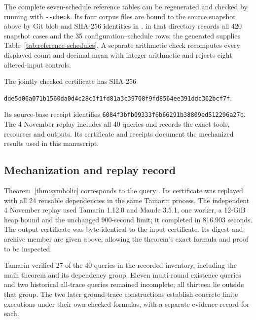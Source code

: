 The complete seven-schedule reference tables can be regenerated and checked
by running
 with
\texttt{-{}-check}. Its four corpus files are bound to the source
snapshot above by Git blob and SHA-256 identities in
.
 in that directory records all 420 snapshot cases and
the 35 configuration--schedule rows; the generated
 supplies Table~\ref{tab:reference-schedules}.
A separate arithmetic check recomputes every displayed count and decimal mean
with integer arithmetic and rejects eight altered-input controls.

The jointly checked certificate has SHA-256
\begin{center}
\small\texttt{dde5d06a071b1560da0d4c28c3f1fd81a3c39708f9fd8564ee391ddc362bcf7f}.
\end{center}
Its source-base receipt identifies
\texttt{6084f3bfb09333f6b66291b38809ed512296a27b}.
The 4 November replay includes all 40 queries and records the exact tools,
resources and outputs. Its certificate and receipts document the
mechanized results used in this manuscript.



\subsection{Mechanization and replay record}

Theorem~\ref{thm:symbolic} corresponds to the query
.
Its certificate was replayed with all 24 reusable dependencies in the same
Tamarin process. The independent 4 November replay used Tamarin 1.12.0 and
Maude 3.5.1, one worker, a 12-GiB heap bound and the unchanged 900-second limit;
it completed in 816.903 seconds. The output certificate was byte-identical to
the input certificate. Its digest and archive member are given above,
allowing the theorem's exact formula and proof to be inspected.

Tamarin verified 27 of the 40 queries in the recorded inventory,
including the main theorem and its dependency group. Eleven multi-round
existence queries and two historical all-trace queries remained
incomplete; all thirteen lie outside that group. The two later
ground-trace constructions establish concrete finite executions under
their own checked formulas, with a separate evidence record for each.


